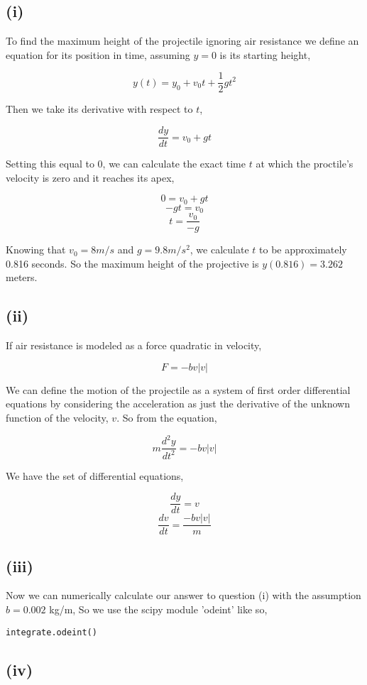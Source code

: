 \documentclass{article}
\begin{document}
\subsection*{(i)}
To find the maximum height of the projectile ignoring air resistance we define an equation for its position in time, assuming $y = 0$ is its starting height,

$$ y(t) = y_{0} + v_{0}t + \frac{1}{2}gt^{2} $$

Then we take its derivative with respect to $t$,

$$ \frac{dy}{dt} = v_{0} + gt $$

Setting this equal to $0$, we can calculate the exact time $t$ at which the proctile's velocity is zero and it reaches its apex,

$$ 0 = v_{0} + gt $$
$$ -gt = v_{0} $$
$$ t = \frac{v_{0}}{-g}$$

Knowing that $v_{0} = 8 m/s$ and $g = 9.8 m/s^2$, we calculate $t$ to be approximately 0.816 seconds.
So the maximum height of the projective is $y(0.816) = 3.262$ meters.

\subsection*{(ii)}
If air resistance is modeled as a force quadratic in velocity,

$$ F = -bv|v|$$

We can define the motion of the projectile as a system of first order differential equations by considering the acceleration as just the derivative of the unknown function of the velocity, $v$.  So from the equation,

$$ m\frac{d^{2}y}{dt^{2}} = -bv|v|$$

We have the set of differential equations,

$$ \frac{dy}{dt} = v  $$
$$ \frac{dv}{dt} = \frac{-bv|v|}{m} $$

\subsection*{(iii)}
Now we can numerically calculate our answer to question (i) with the assumption $ b = 0.002 $ kg/m,
So we use the scipy module 'odeint' like so, 
\begin{verbatim} 
integrate.odeint()
\end{verbatim}

\subsection*{(iv)}
\end{document}

